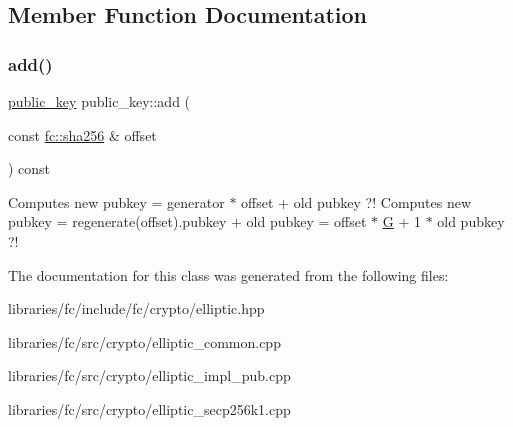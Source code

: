 \subsection{Member Function Documentation}
\mbox{\label{classfc_1_1ecc_1_1public__key_a854601b24237d2723ff9672c1f6f17a7}} 
\subsubsection{\texorpdfstring{add()}{add()}}
{\footnotesize\ttfamily \mbox{\hyperlink{classfc_1_1ecc_1_1public__key}{public\+\_\+key}} public\+\_\+key\+::add (\begin{DoxyParamCaption}\item[{const \mbox{\hyperlink{classfc_1_1sha256}{fc\+::sha256}} \&}]{offset }\end{DoxyParamCaption}) const}

Computes new pubkey = generator $\ast$ offset + old pubkey ?! Computes new pubkey = regenerate(offset).pubkey + old pubkey = offset $\ast$ \mbox{\hyperlink{class_g}{G}} + 1 $\ast$ old pubkey ?! 

The documentation for this class was generated from the following files\+:\begin{DoxyCompactItemize}
\item 
libraries/fc/include/fc/crypto/elliptic.\+hpp\item 
libraries/fc/src/crypto/elliptic\+\_\+common.\+cpp\item 
libraries/fc/src/crypto/elliptic\+\_\+impl\+\_\+pub.\+cpp\item 
libraries/fc/src/crypto/elliptic\+\_\+secp256k1.\+cpp\end{DoxyCompactItemize}
